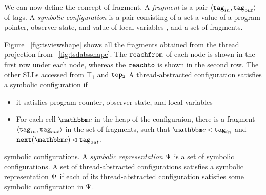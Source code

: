We can now define the concept of fragment.
A {\em fragment} is a pair $\left\langle\mathtt{tag}_{in},\mathtt{tag}_{out}\right\rangle$ of tags.
A {\em symbolic configuration} is a pair consisting of a set a value of a program
pointer, observer state, and value of local variables , and a set of fragments.

Figure ~\ref{fig:tsviewshape} shows all the fragments obtained from the thread projection from ~\ref{fig:tsdabsshape}. The $\mathtt{reachfrom}$ of each node is shown in the first row under each node, whereas the $\mathtt{reachto}$ is shown in the second row. The other SLLs accessed from $\top_1$ and $\tt top_2$  
A thread-abstracted configuration satisfies a symbolic configuration if
\begin{itemize}
\item it satisfies program counter, observer state, and local variables %
\item
  For each cell $\cell$ in the heap of the configuraion, there is
  a fragment $\left\langle\mathtt{tag}_{in},\mathtt{tag}_{out}\right\rangle$ in the set of fragments, such
  that $\cell \lhd \inputtag$ and ${\tt next}(\cell) \lhd \outputtag$.
\end{itemize}

symbolic configurations. 
A {\em symbolic representation} $\Psi$ is a set of
symbolic configurations. 
A  set of thread-abstracted configurations satisfies a symbolic
representation $\Psi$ if each of its thread-abstracted
configuration satisfies some symbolic configuration in $\Psi$.





